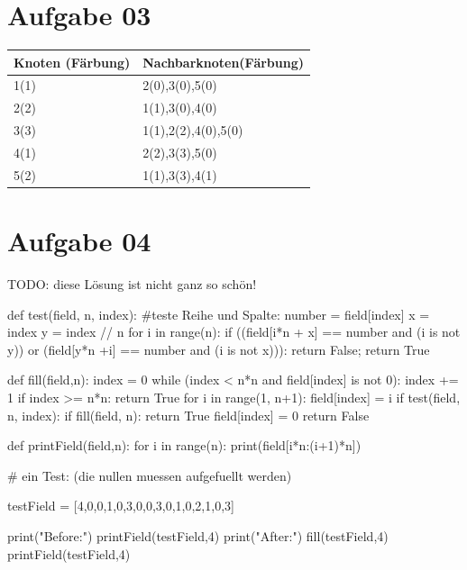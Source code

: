 \documentclass[10pt,a4paper]{article}
\begin{document}
\section*{Aufgabe 03}
    \begin{tabular}{|l |l|}
        \hline
        Knoten (Färbung) & Nachbarknoten(Färbung) \\
        \hline \hline
        1(1) & 2(0),3(0),5(0) \\ \hline
        2(2) & 1(1),3(0),4(0) \\ \hline
        3(3) & 1(1),2(2),4(0),5(0) \\ \hline
        4(1) & 2(2),3(3),5(0) \\ \hline
        5(2) & 1(1),3(3),4(1)\\ \hline
    \end{tabular}

    
\section*{Aufgabe 04}
    TODO: diese L\"osung ist nicht ganz so sch\"on!
    
    \begin{python}[frame=single]
def test(field, n, index):
    #teste Reihe und Spalte:
    number = field[index]
    x = index %
    y = index // n
    for i in range(n):
        if ((field[i*n + x] == number and (i is not y))
            or (field[y*n +i] == number and (i is not x))):
            return False;
    return True

def fill(field,n):
    index = 0
    while (index < n*n and field[index] is not 0):
        index += 1
    if index >= n*n:
        return True
    for i in range(1, n+1):
        field[index] = i
        if test(field, n, index):
            if fill(field, n):
                return True
    field[index] = 0
    return False


def printField(field,n):
    for i in range(n):
        print(field[i*n:(i+1)*n])

# ein Test: (die nullen muessen aufgefuellt werden)
        
testField = [4,0,0,1,0,3,0,0,3,0,1,0,2,1,0,3]

print("Before:")
printField(testField,4)
print("After:")
fill(testField,4)
printField(testField,4)

    \end{python}
\end{document}
